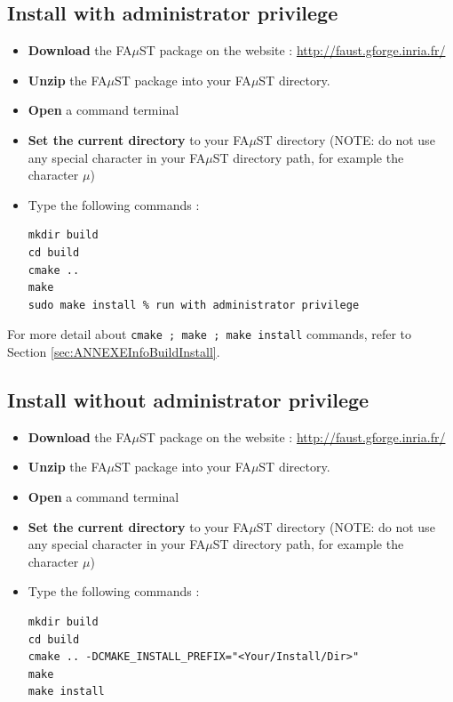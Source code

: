 \subsection{Install with administrator privilege}\label{sec:UnixBuildInstallAdmin}
\begin{itemize}
\item \textbf{Download} the FA$\mu$ST package on the website :  \url{http://faust.gforge.inria.fr/}
\item \textbf{Unzip} the FA$\mu$ST package into your FA$\mu$ST directory.
\item \textbf{Open} a command terminal
\item \textbf{Set the current directory} to your FA$\mu$ST directory (NOTE: do not use any special character in your FA$\mu$ST directory path, for example the character $\mu$)
\item Type the following commands : 
\begin{lstlisting}
mkdir build
cd build
cmake ..
make
sudo make install % run with administrator privilege
\end{lstlisting}
\end{itemize}

For more detail about \texttt{cmake ; make ; make install} commands, refer to Section \ref{sec:ANNEXEInfoBuildInstall}.


\subsection{Install without administrator privilege}\label{sec:UnixBuildInstallNOAdmin}

\begin{itemize}
\item \textbf{Download} the FA$\mu$ST package on the website :  \url{http://faust.gforge.inria.fr/}
\item \textbf{Unzip} the FA$\mu$ST package into your FA$\mu$ST directory.
\item \textbf{Open} a command terminal
\item \textbf{Set the current directory} to your FA$\mu$ST directory (NOTE: do not use any special character in your FA$\mu$ST directory path, for example the character $\mu$)
\item Type the following commands : 
\begin{lstlisting}
mkdir build
cd build
cmake .. -DCMAKE_INSTALL_PREFIX="<Your/Install/Dir>"
make
make install
\end{lstlisting}
\end{itemize}

